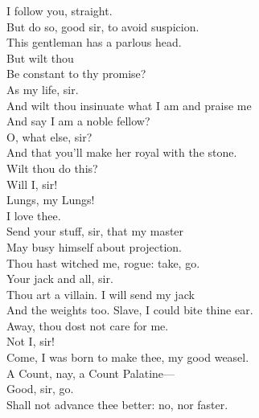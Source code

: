 \documentclass[a4paper,oneside,12pt]{memoir}
\begin{document}
\begin{drama*}
\mammonspeaks {} I follow you, straight.\\
\facespeaks But do so, good sir, to avoid suspicion.\\
This gentleman has a parlous head.\\
\mammonspeaks {} But wilt thou\\
Be constant to thy promise?\\
\facespeaks {} As my life, sir.\\
\mammonspeaks And wilt thou insinuate what I am and praise me\\
And say I am a noble fellow?\\
\facespeaks {} O, what else, sir?\\
And that you'll make her royal with the stone.\\
\mammonspeaks Wilt thou do this?\\
\facespeaks {} Will I, sir!\\
\mammonspeaks {} Lungs, my Lungs!\\
I love thee.\\
\facespeaks {} Send your stuff, sir, that my master\\
May busy himself about projection.\\
\mammonspeaks Thou hast witched me, rogue: take, go.\\
\facespeaks {} Your jack and all, sir.\\
\mammonspeaks Thou art a villain. I will send my jack\\
And the weights too. Slave, I could bite thine ear.\\
Away, thou dost not care for me.\\
\facespeaks {} Not I, sir!\\
\mammonspeaks Come, I was born to make thee, my good weasel.\\
 A Count, nay, a Count Palatine---\\
\facespeaks {} Good, sir, go.\\
\mammonspeaks Shall not advance thee better: no, nor faster.\\

\end{drama*}
\end{document}
